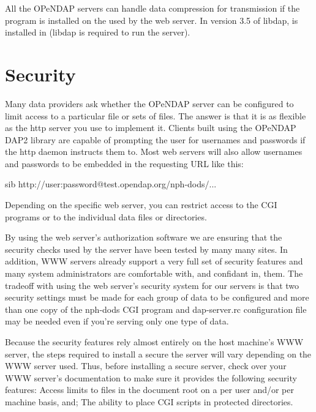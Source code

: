 \documentclass{dods-book}
\begin{document}
All the OPeNDAP servers can handle data compression for transmission if
the  program is installed on the  used by the
web server. In version 3.5 of libdap,  is installed in
 (libdap is required to run the server).



\section{Security}

 Many data providers ask whether the OPeNDAP server can be
configured to limit access to a particular file or sets of files. The
answer is that it is as flexible as the http server you use to
implement it. Clients built using the OPeNDAP DAP2 library are capable of
prompting the user for usernames and passwords if the http daemon
instructs them to. Most web servers will also allow usernames and
passwords to be embedded in the requesting URL like this:

\begin{vcode}{sib}
http://user:password@test.opendap.org/nph-dods/...
\end{vcode}

Depending on the specific web server, you can restrict access to the
CGI programs or to the individual data files or directories.

By using the web server's authorization software we are ensuring that
the security checks used by the server have been tested by many many
sites. In addition, WWW servers already support a very full set of
security features and many system administrators are comfortable with,
and confidant in, them. The tradeoff with using the web server's
security system for our servers is that two security settings must be
made for each group of data to be configured and more than one copy of
the nph-dods CGI program and dap-server.rc configuration file may be
needed even if you're serving only one type of data.

Because the security features rely almost entirely on the host
machine's WWW server, the steps required to install a secure the
server will vary depending on the WWW server used. Thus, before
installing a secure server, check over your WWW server's documentation
to make sure it provides the following security features: Access
limits to files in the document root on a per user and/or per machine
basis, and; The ability to place CGI scripts in protected directories.
\end{document}
